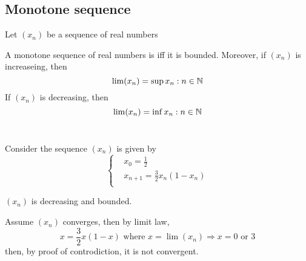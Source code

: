\documentclass[a4paper,12pt]{article}
\begin{document}
\newpage
\subsection{Monotone sequence}

\begin{definition}
    Let \((x_n)\) be a sequence of real numbers
\end{definition}

\begin{theorem}
    A monotone sequence of real numbers is  iff it is bounded. 
Moreover, if \((x_n)\) is increaseing, then 
\[\lim(x_n) = \sup{x_n:n\in\mathbb{N}}\]
    If \((x_n)\) is decreasing, then 
    \[\lim(x_n) = \inf{x_n:n\in\mathbb{N}}\]\\
\end{theorem}

\begin{example}
    Consider the sequence \((x_n)\) is given by 
        \[\begin{cases}
            & x_0 = \frac{1}{2}\\
            & x_{n+1} = \frac{3}{2}x_n(1-x_n)\\
        \end{cases}\]

    \((x_n)\) is decreasing and  bounded.

     Assume \((x_n)\) converges, then by limit law,
    \[x = \frac{3}{2}x(1-x)\text{ where }x=\lim(x_n)\Rightarrow x = 0\text{ or }3\]
    then, by proof of controdiction, it is not convergent.
\end{example}
\end{document}
